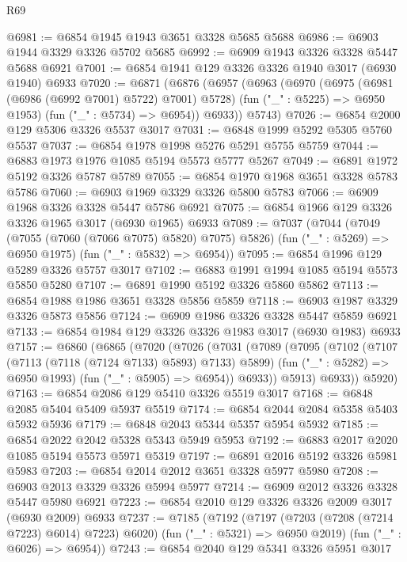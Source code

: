 \begin{lexlean}{R69}
\begin{coremodule}
@6981 := @6854 @1945 @1943 @3651 @3328 @5685 @5688
@6986 := @6903 @1944 @3329 @3326 @5702 @5685
@6992 := @6909 @1943 @3326 @3328 @5447 @5688 @6921
@7001 := @6854 @1941 @129 @3326 @3326 @1940 @3017 (@6930 @1940) @6933
@7020 := @6871
    (@6876
      (@6957
        (@6963
          (@6970
            (@6975 (@6981 (@6986 (@6992 @7001) @5722) @7001) @5728)
            (fun ("_" : @5225) => @6950 @1953)
            (fun ("_" : @5734) => @6954))
          @6933))
      @5743)
@7026 := @6854 @2000 @129 @5306 @3326 @5537 @3017
@7031 := @6848 @1999 @5292 @5305 @5760 @5537
@7037 := @6854 @1978 @1998 @5276 @5291 @5755 @5759
@7044 := @6883 @1973 @1976 @1085 @5194 @5573 @5777 @5267
@7049 := @6891 @1972 @5192 @3326 @5787 @5789
@7055 := @6854 @1970 @1968 @3651 @3328 @5783 @5786
@7060 := @6903 @1969 @3329 @3326 @5800 @5783
@7066 := @6909 @1968 @3326 @3328 @5447 @5786 @6921
@7075 := @6854 @1966 @129 @3326 @3326 @1965 @3017 (@6930 @1965) @6933
@7089 := @7037
    (@7044
      (@7049 (@7055 (@7060 (@7066 @7075) @5820) @7075) @5826)
      (fun ("_" : @5269) => @6950 @1975)
      (fun ("_" : @5832) => @6954))
@7095 := @6854 @1996 @129 @5289 @3326 @5757 @3017
@7102 := @6883 @1991 @1994 @1085 @5194 @5573 @5850 @5280
@7107 := @6891 @1990 @5192 @3326 @5860 @5862
@7113 := @6854 @1988 @1986 @3651 @3328 @5856 @5859
@7118 := @6903 @1987 @3329 @3326 @5873 @5856
@7124 := @6909 @1986 @3326 @3328 @5447 @5859 @6921
@7133 := @6854 @1984 @129 @3326 @3326 @1983 @3017 (@6930 @1983) @6933
@7157 := @6860
    (@6865
      (@7020
        (@7026
          (@7031
            (@7089
              (@7095
                (@7102
                  (@7107 (@7113 (@7118 (@7124 @7133) @5893) @7133) @5899)
                  (fun ("_" : @5282) => @6950 @1993)
                  (fun ("_" : @5905) => @6954))
                @6933))
            @5913)
          @6933))
      @5920)
@7163 := @6854 @2086 @129 @5410 @3326 @5519 @3017
@7168 := @6848 @2085 @5404 @5409 @5937 @5519
@7174 := @6854 @2044 @2084 @5358 @5403 @5932 @5936
@7179 := @6848 @2043 @5344 @5357 @5954 @5932
@7185 := @6854 @2022 @2042 @5328 @5343 @5949 @5953
@7192 := @6883 @2017 @2020 @1085 @5194 @5573 @5971 @5319
@7197 := @6891 @2016 @5192 @3326 @5981 @5983
@7203 := @6854 @2014 @2012 @3651 @3328 @5977 @5980
@7208 := @6903 @2013 @3329 @3326 @5994 @5977
@7214 := @6909 @2012 @3326 @3328 @5447 @5980 @6921
@7223 := @6854 @2010 @129 @3326 @3326 @2009 @3017 (@6930 @2009) @6933
@7237 := @7185
    (@7192
      (@7197 (@7203 (@7208 (@7214 @7223) @6014) @7223) @6020)
      (fun ("_" : @5321) => @6950 @2019)
      (fun ("_" : @6026) => @6954))
@7243 := @6854 @2040 @129 @5341 @3326 @5951 @3017

\end{coremodule}
\end{lexlean}
